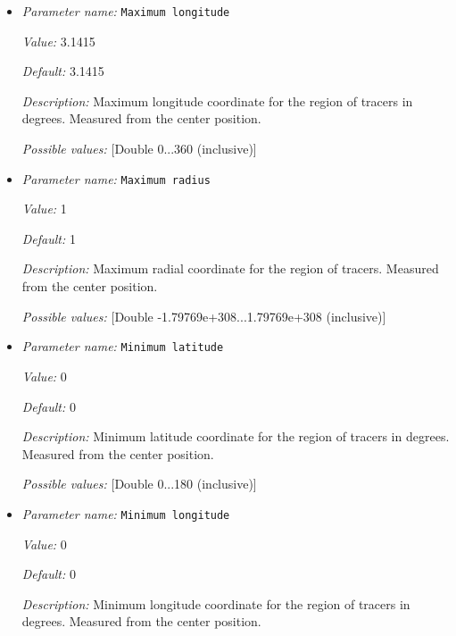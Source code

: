\begin{itemize}
{\it Possible values:} [Double 0...180 (inclusive)]
\item {\it Parameter name:} {\tt Maximum longitude}
\label{parameters:Postprocess/Tracers/Generator/Uniform radial/Maximum longitude}


{\it Value:} 3.1415


{\it Default:} 3.1415


{\it Description:} Maximum longitude coordinate for the region of tracers in degrees. Measured from the center position.


{\it Possible values:} [Double 0...360 (inclusive)]
\item {\it Parameter name:} {\tt Maximum radius}
\label{parameters:Postprocess/Tracers/Generator/Uniform radial/Maximum radius}


{\it Value:} 1


{\it Default:} 1


{\it Description:} Maximum radial coordinate for the region of tracers. Measured from the center position.


{\it Possible values:} [Double -1.79769e+308...1.79769e+308 (inclusive)]
\item {\it Parameter name:} {\tt Minimum latitude}
\label{parameters:Postprocess/Tracers/Generator/Uniform radial/Minimum latitude}


{\it Value:} 0


{\it Default:} 0


{\it Description:} Minimum latitude coordinate for the region of tracers in degrees. Measured from the center position.


{\it Possible values:} [Double 0...180 (inclusive)]
\item {\it Parameter name:} {\tt Minimum longitude}
\label{parameters:Postprocess/Tracers/Generator/Uniform radial/Minimum longitude}


{\it Value:} 0


{\it Default:} 0


{\it Description:} Minimum longitude coordinate for the region of tracers in degrees. Measured from the center position.



\end{itemize}
